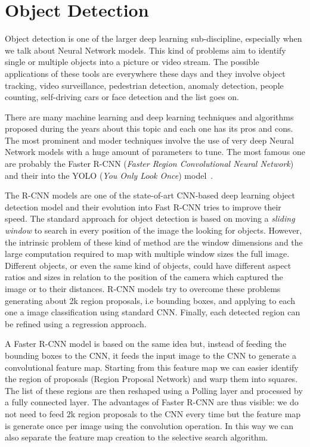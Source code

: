 \documentclass{standalone}
\begin{document}
\section[Object Detection]{Object Detection}\label{obj_detection:obj}

Object detection is one of the larger deep learning sub-discipline, especially when we talk about Neural Network models.
This kind of problems aim to identify single or multiple objects into a picture or video stream.
The possible applications of these tools are everywhere these days and they involve object tracking, video surveillance, pedestrian detection, anomaly detection, people counting, self-driving cars or face detection and the list goes on.

There are many machine learning and deep learning techniques and algorithms proposed during the years about this topic and each one has its pros and cons.
The most prominent and moder techniques involve the use of very deep Neural Network models with a huge amount of parameters to tune.
The most famous one are probably the Faster R-CNN (\emph{Faster Region Convolutional Neural Network})~\cite{ren2015faster} and their  into the YOLO (\emph{You Only Look Once}) model~\cite{redmon2015look, redmon2016yolo9000, redmon2018yolov3}.

The R-CNN models are one of the state-of-art CNN-based deep learning object detection model and their evolution into Fast R-CNN tries to improve their speed.
The standard approach for object detection is based on moving a \emph{sliding window} to search in every position of the image the looking for objects.
However, the intrinsic problem of these kind of method are the window dimensions and the large computation required to map with multiple window sizes the full image.
Different objects, or even the same kind of objects, could have different aspect ratios and sizes in relation to the position of the camera which captured the image or to their distances.
R-CNN models try to overcome these problems generating about 2k region proposals, i.e bounding boxes, and applying to each one a image classification using standard CNN.
Finally, each detected region can be refined using a regression approach.

A Faster R-CNN model is based on the same idea but, instead of feeding the bounding boxes to the CNN, it feeds the input image to the CNN to generate a convolutional feature map.
Starting from this feature map we can easier identify the region of proposals (Region Proposal Network) and warp them into squares.
The list of these regions are then reshaped using a Polling layer and processed by a fully connected layer.
The advantages of Faster R-CNN are thus visible: we do not need to feed 2k region proposals to the CNN every time but the feature map is generate once per image using the convolution operation.
In this way we can also separate the feature map creation to the selective search algorithm.
\end{document}
